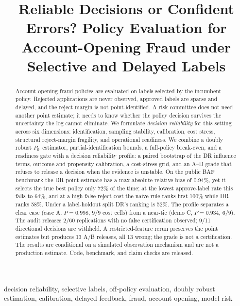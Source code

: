 \documentclass[conference]{IEEEtran}
\newcommand{\Pzero}{\ensuremath{P_0}}
\begin{document}
\title{Reliable Decisions or Confident Errors? Policy Evaluation for Account-Opening Fraud under Selective and Delayed Labels}

\author{
}

\maketitle

\begin{abstract}
Account-opening fraud policies are evaluated on labels selected by the incumbent policy. Rejected applications are never observed, approved labels are sparse and delayed, and the reject margin is not point-identified. A risk committee does not need another point estimate; it needs to know whether the policy decision survives the uncertainty the log cannot eliminate. We formulate \emph{decision reliability} for this setting across six dimensions: identification, sampling stability, calibration, cost stress, structural reject-margin fragility, and operational readiness. We combine a doubly robust \Pzero\ estimator, partial-identification bounds, a full-policy break-even, and a readiness gate with a decision reliability profile: a paired bootstrap of the DR influence terms, outcome and propensity calibration, a cost-stress grid, and an A--D grade that refuses to release a decision when the evidence is unstable. On the public BAF benchmark the DR point estimate has a max absolute relative bias of 0.94\%, yet it selects the true best policy only 72\% of the time; at the lowest approve-label rate this falls to 64\%, and at a high false-reject cost the naive rule ranks first 100\% while DR ranks 58\%. Under a label-holdout split DR's ranking is 52\%. The profile separates a clear case (case A, $P=0.998$, 9/9 cost cells) from a near-tie (demo C, $P=0.934$, 6/9). The audit releases 2/60 replications with no false certification observed; 9/11 directional decisions are withheld. A restricted-feature rerun preserves the point estimates but produces 13 A/B releases, all 13 wrong; the grade is not a certification. The results are conditional on a simulated observation mechanism and are not a production estimate. Code, benchmark, and claim checks are released.
\end{abstract}

\begin{IEEEkeywords}
decision reliability, selective labels, off-policy evaluation, doubly robust estimation, calibration, delayed feedback, fraud, account opening, model risk
\end{IEEEkeywords}
\end{document}

